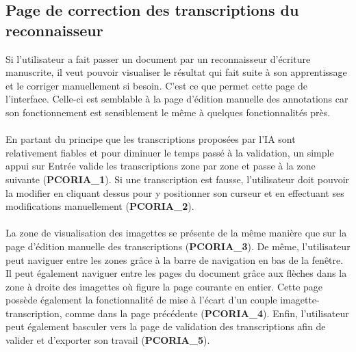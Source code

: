 \subsection{Page de correction des transcriptions du reconnaisseur}

Si l’utilisateur a fait passer un document par un reconnaisseur d’écriture
manuscrite, il veut pouvoir visualiser le résultat qui fait suite à son
apprentissage et le corriger manuellement si besoin. C’est ce que permet
cette page de l’interface. Celle-ci est semblable à la page d’édition manuelle
des annotations car son fonctionnement est sensiblement le même à quelques
fonctionnalités près.

\paragraph{}
En partant du principe que les transcriptions proposées par l’IA sont
relativement fiables et pour diminuer le temps passé à la validation, un simple
appui sur Entrée valide les transcriptions zone par zone et passe à la zone
suivante (\textbf{PCORIA\_1}). Si une transcription est fausse, l’utilisateur
doit pouvoir la modifier en cliquant dessus pour y positionner son curseur et
en effectuant ses modifications manuellement (\textbf{PCORIA\_2}).

\paragraph{}
La zone de visualisation des imagettes se présente de la même manière que sur
la page d’édition manuelle des transcriptions (\textbf{PCORIA\_3}). De même, 
l’utilisateur peut naviguer entre les zones grâce à la barre de navigation en 
bas de la fenêtre. Il peut également naviguer entre les pages du document grâce 
aux flèches dans la zone à droite des imagettes où figure la page courante 
en entier. Cette page
possède également la fonctionnalité de mise à l’écart d’un couple
imagette-transcription, comme dans la page précédente (\textbf{PCORIA\_4}).
Enfin, l’utilisateur peut également basculer vers la page de validation des
transcriptions afin de valider et d’exporter son travail (\textbf{PCORIA\_5}).

\newpage

